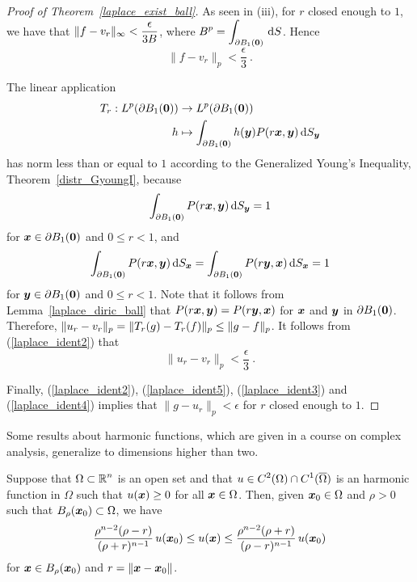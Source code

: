 \begin{proof}[Proof of Theorem~\ref{laplace_exist_ball}]
As seen in (iii), for $r$ closed enough to $1$, we have that
$\displaystyle \| f - v_r \|_\infty < \frac{\epsilon}{3 B}$, where
$\displaystyle B^p = \int_{\partial B_1({\bm{0}})} \,\mathrm{d}{S}$.  Hence
\begin{equation} \label{laplace_ident3}
\| f - v_r \|_p < \frac{\epsilon}{3} \  . 
\end{equation}

The linear application
\begin{align*}
T_r: L^p(\partial B_1({\bm{0}})) &\rightarrow L^p(\partial B_1({\bm{0}})) \\
h &\mapsto \int_{\partial B_1({\bm{0}})} h({\bm{y}}) P(r{\bm{x}},{\bm{y}}) \,\mathrm{d}{S}_{{\bm{y}}}
\end{align*}
has norm less than or equal to $1$ according to the Generalized
Young's Inequality, Theorem~\ref{distr_GyoungI}, because
\[
  \int_{\partial B_1({\bm{0}})} P(r{\bm{x}},{\bm{y}}) \,\mathrm{d}{S}_{{\bm{y}}} = 1
\]
for ${\bm{x}} \in \partial B_1({\bm{0}})$ and $0 \leq r <1$, and
\[
\int_{\partial B_1({\bm{0}})} P(r{\bm{x}},{\bm{y}}) \,\mathrm{d}{S}_{{\bm{x}}} =
\int_{\partial B_1({\bm{0}})} P(r{\bm{y}},{\bm{x}}) \,\mathrm{d}{S}_{{\bm{x}}} = 1
\]
for ${\bm{y}} \in \partial B_1({\bm{0}})$ and $0 \leq r <1$.
Note that it follows from Lemma~\ref{laplace_diric_ball} that
$P(r{\bm{x}}, {\bm{y}}) = P(r{\bm{y}},{\bm{x}})$ for
${\bm{x}}$ and ${\bm{y}}$ in $\partial B_1({\bm{0}})$.
Therefore, $\displaystyle \| u_r - v_r \|_p
= \|T_r(g) - T_r(f) \|_p \leq \|g - f \|_p$.
It follows from (\ref{laplace_ident2}) that
\begin{equation} \label{laplace_ident4}
\| u_r - v_r \|_p < \frac{\epsilon}{3} \ .
\end{equation}

Finally, (\ref{laplace_ident2}), (\ref{laplace_ident5}),
(\ref{laplace_ident3}) and (\ref{laplace_ident4}) implies that
$\|g-u_r\|_p < \epsilon$ for $r$ closed enough to $1$.
\end{proof}

Some results about harmonic functions, which are given in a course on
complex analysis, generalize to dimensions higher than two.

\begin{theorem}
Suppose that $\displaystyle \Omega \subset \mathbb{R}^n$ is an open set and that
$\displaystyle u \in C^2(\Omega)\cap C^1(\overline{\Omega})$ is an
harmonic function in $\Omega$ such that $u({\bm{x}}) \geq 0$ for all
${\bm{x}} \in \Omega$.  Then, given ${\bm{x}}_0 \in \Omega$ and $\rho>0$ such that
$B_{\rho}({\bm{x}}_0) \subset \Omega$, we have
\[
\frac{\rho^{n-2}(\rho-r)}{(\rho+r)^{n-1}}\, u({\bm{x}}_0) \leq u({\bm{x}}) \leq
\frac{\rho^{n-2}(\rho+r)}{(\rho-r)^{n-1}}\, u({\bm{x}}_0)
\]
for ${\bm{x}} \in B_{\rho}({\bm{x}}_0)$ and $r=\|{\bm{x}}-{\bm{x}}_0\|$.
\end{theorem}

